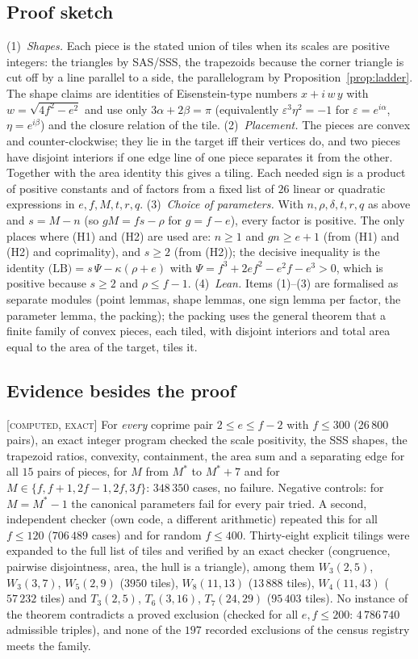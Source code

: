 \documentclass[11pt,reqno]{amsart}
\theoremstyle{plain}
\theoremstyle{definition}
\newcommand{\lab}[1]{\textup{[\textsc{#1}]}}
\newcommand{\CE}{\lab{computed, exact}}
\begin{document}
\subsection{Proof sketch}\label{sub:Wsketch}
(1)~\emph{Shapes.} Each piece is the stated union of tiles when its scales are positive integers: the triangles by SAS/SSS, the trapezoids because the corner triangle is cut off by a line parallel to a side, the parallelogram by Proposition~\ref{prop:ladder}. The shape claims are identities of Eisenstein-type numbers $x+i\,w\,y$ with $w=\sqrt{4f^2-e^2}$ and use only $3\alpha+2\beta=\pi$ (equivalently $\varepsilon^3\eta^2=-1$ for $\varepsilon=e^{i\alpha}$, $\eta=e^{i\beta}$) and the closure relation of the tile.
(2)~\emph{Placement.} The pieces are convex and counter-clockwise; they lie in the target iff their vertices do, and two pieces have disjoint interiors if one edge line of one piece separates it from the other. Together with the area identity this gives a tiling. Each needed sign is a product of positive constants and of factors from a fixed list of $26$ linear or quadratic expressions in $e,f,M,t,r,q$.
(3)~\emph{Choice of parameters.} With $n,\rho,\delta,t,r,q$ as above and $s=M-n$ (so $gM=fs-\rho$ for $g=f-e$), every factor is positive. The only places where (H1) and (H2) are used are: $n\ge1$ and $gn\ge e+1$ (from (H1) and (H2) and coprimality), and $s\ge2$ (from (H2)); the decisive inequality is the identity $\text{(LB)}=s\,\Psi-\kappa(\rho+e)$ with $\Psi=f^3+2ef^2-e^2f-e^3>0$, which is positive because $s\ge2$ and $\rho\le f-1$.
(4)~\emph{Lean.} Items (1)--(3) are formalised as separate modules (point lemmas, shape lemmas, one sign lemma per factor, the parameter lemma, the packing); the packing uses the general theorem that a finite family of convex pieces, each tiled, with disjoint interiors and total area equal to the area of the target, tiles it.

\subsection{Evidence besides the proof}\label{sub:Wevidence}
\CE{} For \emph{every} coprime pair $2\le e\le f-2$ with $f\le300$ (26\,800 pairs), an exact integer program checked the scale positivity, the SSS shapes, the trapezoid ratios, convexity, containment, the area sum and a separating edge for all $15$ pairs of pieces, for $M$ from $M^*$ to $M^*+7$ and for $M\in\{f,f+1,2f-1,2f,3f\}$: $348\,350$ cases, no failure. Negative controls: for $M=M^*-1$ the canonical parameters fail for every pair tried. A second, independent checker (own code, a different arithmetic) repeated this for all $f\le120$ ($706\,489$ cases) and for random $f\le400$.
Thirty-eight explicit tilings were expanded to the full list of tiles and verified by an exact checker (congruence, pairwise disjointness, area, the hull is a triangle), among them $W_3(2,5)$, $W_3(3,7)$, $W_5(2,9)$ ($3950$ tiles), $W_8(11,13)$ ($13\,888$ tiles), $W_4(11,43)$ ($57\,232$ tiles) and $T_3(2,5)$, $T_6(3,16)$, $T_7(24,29)$ ($95\,403$ tiles).
No instance of the theorem contradicts a proved exclusion (checked for all $e,f\le200$: $4\,786\,740$ admissible triples), and none of the $197$ recorded exclusions of the census registry meets the family.
\end{document}
